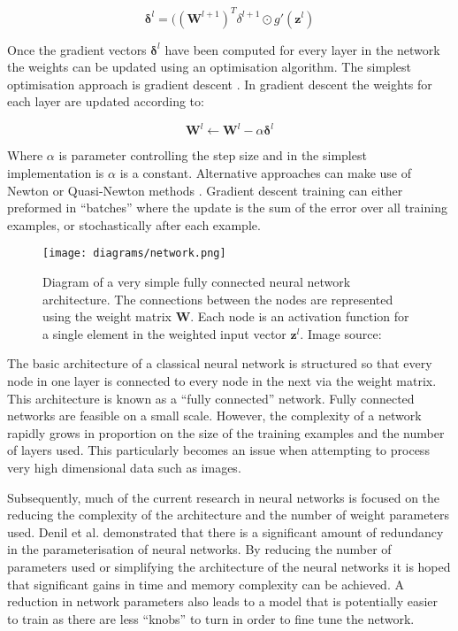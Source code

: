 \documentclass[journal]{IEEEtran}
\begin{document}
\begin{equation}
\label{eq:backprop2}
	\bm{\delta}^l = ((\bm{W}^{l+1})^T \delta^{l+1} \odot g'(\bm{z}^l)
\end{equation}

Once the gradient vectors $\bm{\delta}^l$ have been computed for every layer in the network the weights can be updated using an optimisation algorithm. The simplest optimisation approach is gradient descent \cite{lecun2012efficient}. In gradient descent the weights for each layer are updated according to:

\begin{equation}
	\bm{W}^l \leftarrow \bm{W}^l - \alpha \bm{\delta}^l
\end{equation}

Where $\alpha$ is parameter controlling the step size and in the simplest implementation is $\alpha$ is a constant. Alternative approaches can make use of Newton or Quasi-Newton methods \cite{lecun2012efficient}. Gradient descent training can either preformed in ``batches'' where the update is the sum of the error over all training examples, or stochastically after each example.

\begin{figure}[h!]
\centering
\texttt{[image: diagrams/network.png]}
\caption{Diagram of a very simple fully connected neural network architecture. The connections between the nodes are represented using the weight matrix $\bm{W}$. Each node is an activation function for a single element in the weighted input vector $\bm{z}^l$. Image source: \cite{multilayernetwork}}
\label{fig:neural-network}
\end{figure}


The basic architecture of a classical neural network is structured so that every node in one layer is connected to every node in the next via the weight matrix. This architecture is known as a ``fully connected'' network. Fully connected networks are feasible on a small scale. However, the complexity of a network rapidly grows in proportion on the size of the training examples and the number of layers used. This particularly becomes an issue when attempting to process very high dimensional data such as images.

Subsequently, much of the current research in neural networks is focused on the reducing the complexity of the architecture and the number of weight parameters used. Denil et al. \cite{denil2013predicting} demonstrated that there is a significant amount of redundancy in the parameterisation of neural networks. By reducing the number of parameters used or simplifying the architecture of the neural networks it is hoped that significant gains in time and memory complexity can be achieved. A reduction in network parameters also leads to a model that is potentially easier to train as there are less ``knobs'' to turn in order to fine tune the network.
\end{document}
